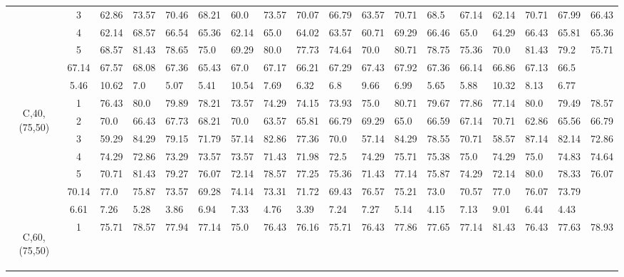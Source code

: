 \begin{table}[h]
{\begin{tabular}{cc|llll|llll|llll|llll}
 & 3 & 62.86 & 73.57 & 70.46 & 68.21 & 60.0 & 73.57 & 70.07 & 66.79 & 63.57 & 70.71 & 68.5 & 67.14 & 62.14 & 70.71 & 67.99 & 66.43 \\
 & 4 & 62.14 & 68.57 & 66.54 & 65.36 & 62.14 & 65.0 & 64.02 & 63.57 & 60.71 & 69.29 & 66.46 & 65.0 & 64.29 & 66.43 & 65.81 & 65.36 \\
 & 5 & 68.57 & 81.43 & 78.65 & 75.0 & 69.29 & 80.0 & 77.73 & 74.64 & 70.0 & 80.71 & 78.75 & 75.36 & 70.0 & 81.43 & 79.2 & 75.71 \\
\rowcolor{lightgray!50}\multicolumn{2}{r|}{avg} & 67.14 & 67.57 & 68.08 & 67.36 & 65.43 & 67.0 & 67.17 & 66.21 & 67.29 & 67.43 & 67.92 & 67.36 & 66.14 & 66.86 & 67.13 & 66.5 \\
\rowcolor{lightgray!50}\multicolumn{2}{r|}{std} & 5.46 & 10.62 & 7.0 & 5.07 & 5.41 & 10.54 & 7.69 & 6.32 & 6.8 & 9.66 & 6.99 & 5.65 & 5.88 & 10.32 & 8.13 & 6.77 \\
\multirow{5}{*}{\begin{sideways}C,40,(75,50)\end{sideways}} & 1 & 76.43 & 80.0 & 79.89 & 78.21 & 73.57 & 74.29 & 74.15 & 73.93 & 75.0 & 80.71 & 79.67 & 77.86 & 77.14 & 80.0 & 79.49 & 78.57 \\
 & 2 & 70.0 & 66.43 & 67.73 & 68.21 & 70.0 & 63.57 & 65.81 & 66.79 & 69.29 & 65.0 & 66.59 & 67.14 & 70.71 & 62.86 & 65.56 & 66.79 \\
 & 3 & 59.29 & 84.29 & 79.15 & 71.79 & 57.14 & 82.86 & 77.36 & 70.0 & 57.14 & 84.29 & 78.55 & 70.71 & 58.57 & 87.14 & 82.14 & 72.86 \\
 & 4 & 74.29 & 72.86 & 73.29 & 73.57 & 73.57 & 71.43 & 71.98 & 72.5 & 74.29 & 75.71 & 75.38 & 75.0 & 74.29 & 75.0 & 74.83 & 74.64 \\
 & 5 & 70.71 & 81.43 & 79.27 & 76.07 & 72.14 & 78.57 & 77.25 & 75.36 & 71.43 & 77.14 & 75.87 & 74.29 & 72.14 & 80.0 & 78.33 & 76.07 \\
\rowcolor{lightgray!50}\multicolumn{2}{r|}{avg} & 70.14 & 77.0 & 75.87 & 73.57 & 69.28 & 74.14 & 73.31 & 71.72 & 69.43 & 76.57 & 75.21 & 73.0 & 70.57 & 77.0 & 76.07 & 73.79 \\
\rowcolor{lightgray!50}\multicolumn{2}{r|}{std} & 6.61 & 7.26 & 5.28 & 3.86 & 6.94 & 7.33 & 4.76 & 3.39 & 7.24 & 7.27 & 5.14 & 4.15 & 7.13 & 9.01 & 6.44 & 4.43 \\
\multirow{5}{*}{\begin{sideways}C,60,(75,50)\end{sideways}} & 1 & 75.71 & 78.57 & 77.94 & 77.14 & 75.0 & 76.43 & 76.16 & 75.71 & 76.43 & 77.86 & 77.65 & 77.14 & 81.43 & 76.43 & 77.63 & 78.93 \\

\end{tabular}}
\end{table}
